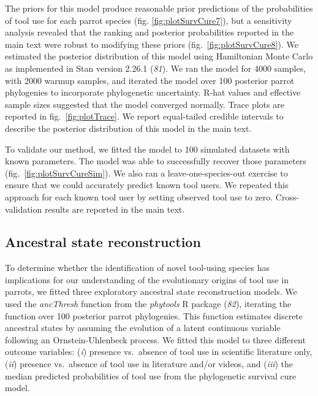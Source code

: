 \documentclass[
  man,floatsintext]{apa6}
\begin{document}
The priors for this model produce reasonable prior predictions of the
probabilities of tool use for each parrot species (fig.
\ref{fig:plotSurvCure7}), but a sensitivity analysis revealed that the ranking
and posterior probabilities reported in the main text were robust to modifying
these priors (fig.~\ref{fig:plotSurvCure8}). We estimated the
posterior distribution of this model using Hamiltonian Monte Carlo as
implemented in Stan version 2.26.1 (\emph{81}). We ran the model for 4000
samples, with 2000 warmup samples, and iterated the model over 100 posterior
parrot phylogenies to incorporate phylogenetic uncertainty. R-hat values and
effective sample sizes suggested that the model converged normally. Trace plots
are reported in fig.~\ref{fig:plotTrace}. We report
equal-tailed credible intervals to describe the posterior distribution of this
model in the main text.

To validate our method, we fitted the model to 100 simulated datasets with known
parameters. The model was able to successfully recover those parameters
(fig.~\ref{fig:plotSurvCureSim}). We also ran a
leave-one-species-out exercise to ensure that we could accurately predict known
tool users. We repeated this approach for each known tool user by setting
observed tool use to zero. Cross-validation results are reported in the main
text.

\hypertarget{ancestral-state-reconstruction}{%
\subsection{Ancestral state reconstruction}\label{ancestral-state-reconstruction}}

To determine whether the identification of novel tool-using species has
implications for our understanding of the evolutionary origins of tool use in
parrots, we fitted three exploratory ancestral state reconstruction models. We
used the \emph{ancThresh} function from the \emph{phytools} R package (\emph{82}),
iterating the function over 100 posterior parrot phylogenies. This function
estimates discrete ancestral states by assuming the evolution of a latent
continuous variable following an Ornstein-Uhlenbeck process. We fitted this
model to three different outcome variables: (\emph{i}) presence vs.~absence of tool
use in scientific literature only, (\emph{ii}) presence vs.~absence of tool use in
literature and/or videos, and (\emph{iii}) the median predicted probabilities of tool
use from the phylogenetic survival cure model.
\end{document}
